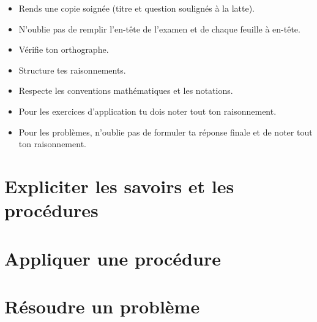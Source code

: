 \documentclass[a4paper, 12pt, parskip=half-]{scrartcl}
\begin{document}
\entete
{}
\begin{itemize}
    \item Rends une copie soignée (titre et question soulignés à la latte).
    \item N'oublie pas de remplir l'en-tête de l'examen et de chaque feuille à en-tête.
    \item Vérifie ton orthographe.
    \item Structure tes raisonnements.
    \item Respecte les conventions mathématiques et les notations.
    \item Pour les exercices d'application tu dois noter tout ton raisonnement.
    \item Pour les problèmes, n'oublie pas de formuler ta réponse finale et de noter tout ton raisonnement.
\end{itemize}
\newpage
\section{Expliciter les savoirs et les procédures}

\newpage
\section{Appliquer une procédure}

\newpage
\section{Résoudre un problème}

\newpage
\printsolutions
\end{document}
